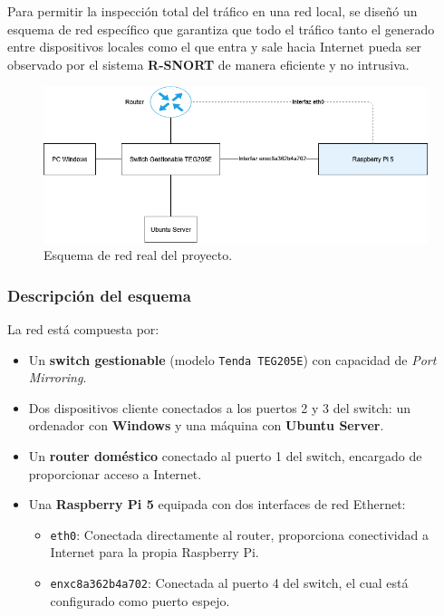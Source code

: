 \documentclass[11pt,a4paper,twoside]{report}
\begin{document}
Para permitir la inspección total del tráfico en una red local, se diseñó un esquema de red específico que garantiza que todo el tráfico tanto el generado entre dispositivos locales como el que entra y sale hacia Internet pueda ser observado por el sistema \textbf{R-SNORT} de manera eficiente y no intrusiva.

\begin{figure}[H]
	\centering
	\includegraphics[scale=0.6]{script_automatico/network.png}
	\caption{Esquema de red real del proyecto.}
\end{figure}

\subsubsection{Descripción del esquema}

La red está compuesta por:

\begin{itemize}
	\item Un \textbf{switch gestionable} (modelo \texttt{Tenda TEG205E}) con capacidad de \textit{Port Mirroring}.
	\item Dos dispositivos cliente conectados a los puertos 2 y 3 del switch: un ordenador con \textbf{Windows} y una máquina con \textbf{Ubuntu Server}.
	\item Un \textbf{router doméstico} conectado al puerto 1 del switch, encargado de proporcionar acceso a Internet.
	\item Una \textbf{Raspberry Pi 5} equipada con dos interfaces de red Ethernet:
	\begin{itemize}
		\item \texttt{eth0}: Conectada directamente al router, proporciona conectividad a Internet para la propia Raspberry Pi.
		\item \texttt{enxc8a362b4a702}: Conectada al puerto 4 del switch, el cual está configurado como puerto espejo.
	\end{itemize}
\end{itemize}
\end{document}
